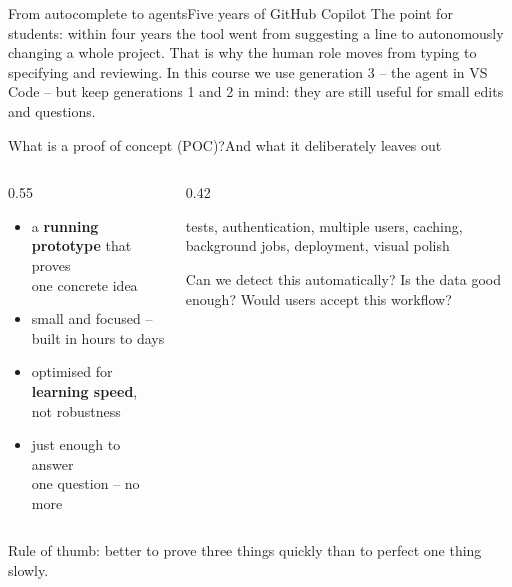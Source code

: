 \documentclass[aspectratio=169,11pt]{beamer}
\newcommand{\takeaway}[1]{%
  \par\vfill
  \begin{tcolorbox}[enhanced,colback=green!4,colframe=green!50!black,boxrule=0pt,leftrule=2.5pt,arc=2pt,
    left=2mm,right=2mm,top=1mm,bottom=1mm,fontupper=\small,before skip=2pt,after skip=0pt]
    \makebox[1.3em][l]{\color{green!50!black}\faLightbulb}%
    \parbox[t]{\dimexpr\linewidth-1.3em\relax}{\raggedright\hyphenpenalty=10000\exhyphenpenalty=10000 #1}%
  \end{tcolorbox}}
\begin{document}
\begin{frame}{From autocomplete to agents}{Five years of GitHub Copilot}
{  The point for students: within four years the tool went from suggesting a line to autonomously changing a whole project. That is why the human role moves from typing to specifying and reviewing. In this course we use generation 3 -- the agent in VS Code -- but keep generations 1 and 2 in mind: they are still useful for small edits and questions.}
\end{frame}

\begin{frame}{What is a proof of concept (POC)?}{And what it deliberately leaves out}
  \vspace{2pt}
  \begin{columns}[T,onlytextwidth]
    \begin{column}{0.55\textwidth}
      \begin{keybox}
        \begin{itemize}\setlength{\itemsep}{2pt}
          \item a \textbf{running prototype} that proves\\one concrete idea
          \item small and focused -- built in hours to days
          \item optimised for \textbf{learning speed},\\not robustness
          \item just enough to answer\\one question -- no more
        \end{itemize}
      \end{keybox}
    \end{column}
    \begin{column}{0.42\textwidth}
      \begin{warnbox}
                tests, authentication, multiple users, caching, background jobs, deployment, visual polish
      \end{warnbox}
      \vskip3pt %
      \begin{infobox}
        Can we detect this automatically? Is the data good enough? Would users accept this workflow?
      \end{infobox}
    \end{column}
  \end{columns}
  \takeaway{Rule of thumb: better to prove three things quickly than to perfect one thing slowly.}
\end{frame}
\end{document}
